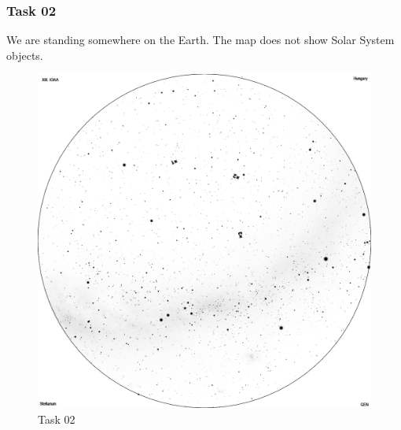 \documentclass[a4paper,12pt]{extarticle}
\begin{document}
\subsubsection{Task 02}

We are standing somewhere on the Earth. The map does not show Solar System objects.
\begin{figure}[H]
    \centering
    \includegraphics[width=0.95\linewidth]{19_O2.png}
    \caption{Task 02}
\end{figure}
\end{document}
